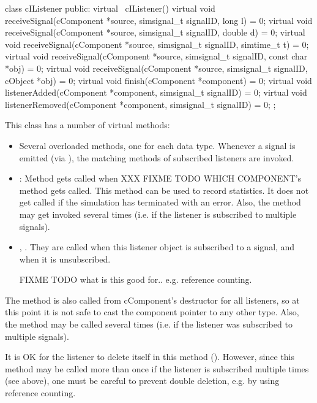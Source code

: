 \begin{note}
\begin{note}
\begin{cpp}
class cIListener
{
  public:
    virtual ~cIListener() {}
    virtual void receiveSignal(cComponent *source, simsignal_t signalID, long l) = 0;
    virtual void receiveSignal(cComponent *source, simsignal_t signalID, double d) = 0;
    virtual void receiveSignal(cComponent *source, simsignal_t signalID, simtime_t t) = 0;
    virtual void receiveSignal(cComponent *source, simsignal_t signalID, const char *obj) = 0;
    virtual void receiveSignal(cComponent *source, simsignal_t signalID, cObject *obj) = 0;
    virtual void finish(cComponent *component) = 0;
    virtual void listenerAdded(cComponent *component, simsignal_t signalID) = 0;
    virtual void listenerRemoved(cComponent *component, simsignal_t signalID) = 0;
};
\end{cpp}

This class has a number of virtual methods:

\begin{itemize}
  \item Several overloaded  methods, one for each
    data type. Whenever a signal is emitted (via ),
    the matching  methods of subscribed listeners
    are invoked.
  \item {}: Method gets called when XXX FIXME TODO WHICH COMPONENT's
     method gets called. This method can be used to record
    statistics. It does not get called if the simulation has terminated
    with an error. Also, the method may get invoked several times (i.e.
    if the listener is subscribed to multiple signals).
  \item {}, . They are called
    when this listener object is subscribed to a signal, and when it is
    unsubscribed.

    FIXME TODO what is this good for.. e.g. reference counting.
\end{itemize}

The  method is also called from cComponent's destructor for all
listeners, so at this point it is not safe to cast the component pointer
to any other type. Also, the method may be called several times (i.e.
if the listener was subscribed to multiple signals).

It is OK for the listener to delete itself in this method ().
However, since this method may be called more than once if the listener
is subscribed multiple times (see above), one must be careful to prevent
double deletion, e.g. by using reference counting.


\end{note}
\end{note}
